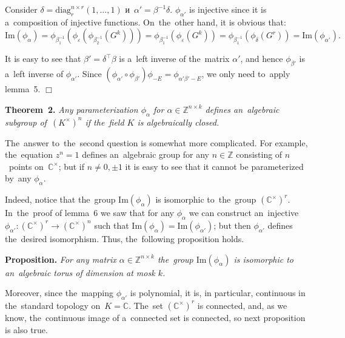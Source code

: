 \documentclass[twoside]{article}
\begin{document}
    Consider $\delta = \mathrm{diag}^{n \times r}_r(1, \ldots, 1)$ и~$\alpha' = \beta^{-1} \delta$.
    $\phi_{\alpha'}$ is injective since it is a~composition of injective functions. On~the~other hand, it is obvious that:
    $$
        \mathrm{Im}(\phi_\alpha) = \phi_{\beta_1^{-1}} (\phi_\varepsilon (\phi_{\beta_2^{-1}} (G^k)))
                                 = \phi_{\beta_1^{-1}} (\phi_\varepsilon (G^k))
                                 = \phi_{\beta_1^{-1}} (\phi_{\delta} (G^r))
                                 = \mathrm{Im}(\phi_{\alpha'}).
    $$

    It is easy to see that $\beta' = \delta^{\top} \beta$ is a~left inverse of the~matrix $\alpha'$,
    and hence $\phi_{\beta'}$ is a~left inverse of $\phi_{\alpha'}$. Since $(\phi_{\alpha'} \circ \phi_{\beta'}) \phi_{-E} = \phi_{\alpha' \beta' - E}$,
    we only need to~apply lemma~5.
\hfill$\Box$\medskip

\medskip\noindent\textbf{Theorem~2.}\emph{
    Any parameterization $\phi_\alpha$ for $\alpha \in \mathbb{Z}^{n \times k}$ defines an~algebraic subgroup
    of~$(K^\times)^n$ if the~field $K$ is algebraically closed.
}\medskip

The~answer to~the~second question is somewhat more complicated. For example, the~equation $z^n = 1$ defines an~algebraic
group for any $n \in \mathbb{Z}$ consisting of $n$~points on~$\mathbb{C}^\times$; but if $n \neq 0, \pm 1$
it is easy to see that it cannot be parameterized by~any $\phi_\alpha$.

Indeed, notice that the~group $\mathrm{Im}(\phi_\alpha)$ is isomorphic to~the~group $(\mathbb{C}^\times)^r$.
In~the~proof of lemma~6 we saw that for any $\phi_\alpha$ we can construct an~injective $\phi_{\alpha'} : (\mathbb{C}^\times)^r \rightarrow (\mathbb{C}^\times)^n$
such that $\mathrm{Im}(\phi_\alpha) = \mathrm{Im}(\phi_{\alpha'})$; but then $\phi_{\alpha'}$ defines the~desired isomorphism.
Thus, the~following proposition holds.

\medskip\noindent\textbf{Proposition.}\emph{
    For any matrix $\alpha \in \mathbb{Z}^{n \times k}$ the~group $\mathrm{Im}(\phi_\alpha)$ is isomorphic to an~algebraic torus
    of dimension at mosk $k$.
}\medskip

Moreover, since the~mapping $\phi_{\alpha'}$ is polynomial, it is, in particular, continuous in the~standard topology
on~$K = \mathbb{C}$. The~set $(\mathbb{C}^\times)^r$ is connected, and, as we know, the~continuous image
of a~connected set is connected, so next proposition is also true.
\end{document}
